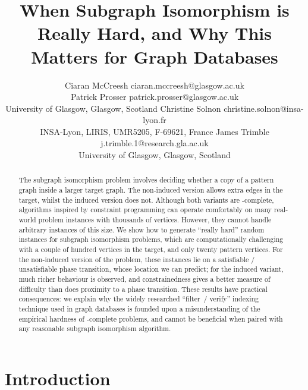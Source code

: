 \documentclass[twoside,11pt]{article}
\begin{document}
\title{When Subgraph Isomorphism is Really Hard, and Why This Matters for Graph
Databases}

\author{\name Ciaran McCreesh \email ciaran.mccreesh@glasgow.ac.uk \\
       \name Patrick Prosser \email patrick.prosser@glasgow.ac.uk \\
       \addr University of Glasgow, Glasgow, Scotland
       \AND
       \name Christine Solnon \email christine.solnon@insa-lyon.fr \\
       \addr INSA-Lyon, LIRIS, UMR5205, F-69621, France
       \AND
       \name James Trimble \email j.trimble.1@research.gla.ac.uk \\
       \addr University of Glasgow, Glasgow, Scotland}
\maketitle

\begin{abstract}
    The subgraph isomorphism problem involves deciding whether a copy of a pattern graph inside a larger
    target graph. The non-induced version allows extra edges in the target, whilst the induced
    version does not.  Although both variants are \NP-complete, algorithms inspired by constraint programming
    can operate comfortably on many real-world problem instances with thousands of vertices.
    However, they cannot handle arbitrary instances of this size. We show how to generate ``really
    hard'' random instances for subgraph isomorphism problems, which are computationally challenging
    with a couple of hundred vertices in the target, and only twenty pattern vertices. For the
    non-induced version of the problem, these instances lie on a satisfiable / unsatisfiable phase
    transition, whose location we can predict; for the induced variant, much richer behaviour is
    observed, and constrainedness gives a better measure of difficulty than does proximity to a
    phase transition.  These results have practical consequences: we explain why the widely
    researched ``filter~/ verify'' indexing technique used in graph databases is founded upon a
    misunderstanding of the empirical hardness of \NP-complete problems, and cannot be beneficial
    when paired with any reasonable subgraph isomorphism algorithm.
\end{abstract}

\section{Introduction}\label{section:introduction}
\end{document}
